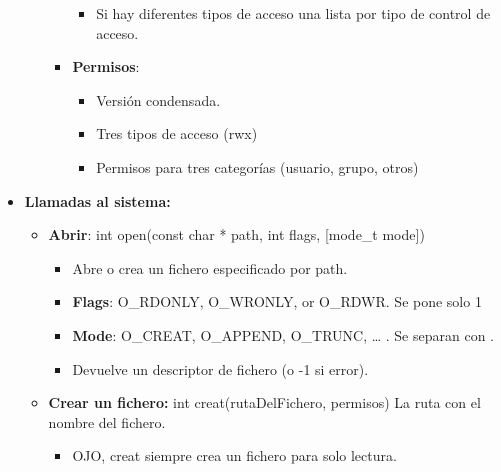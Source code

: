 \documentclass[12pt, twoside, openright]{report} %
\begin{document}
\begin{itemize}
\begin{itemize}
\begin{itemize}
        \begin{itemize}
        \item Si hay diferentes tipos de acceso una lista por tipo de
          control de acceso.
          
        \end{itemize}
      \item \textbf{Permisos}:
        

        \begin{itemize}
        \item Versión condensada.
          
        \item Tres tipos de acceso (rwx)
          
        \item Permisos para tres categorías (usuario, grupo, otros)
          
        \end{itemize}
      \end{itemize}
    \end{itemize}
  \item \textbf{Llamadas al sistema:}
    

    \begin{itemize}
    \item \textbf{Abrir}: int open(const char * path, int flags, {[}mode\_t
      mode{]})
      

      \begin{itemize}
      \item Abre o crea un fichero especificado por path.
        
      \item \textbf{Flags}: O\_RDONLY, O\_WRONLY, or O\_RDWR. Se pone solo 1
        
      \item \textbf{Mode}: O\_CREAT, O\_APPEND, O\_TRUNC, \ldots{} . Se
        separan con \textbar.
        
      \item Devuelve un descriptor de fichero (o -1 si error).
        
      \end{itemize}
    \item \textbf{Crear un fichero:} int creat(rutaDelFichero, permisos) La
      ruta con el nombre del fichero.
      

      \begin{itemize}
      \item OJO, creat siempre crea un fichero para solo lectura.
        

\end{itemize}
\end{itemize}
\end{itemize}
\end{document}
